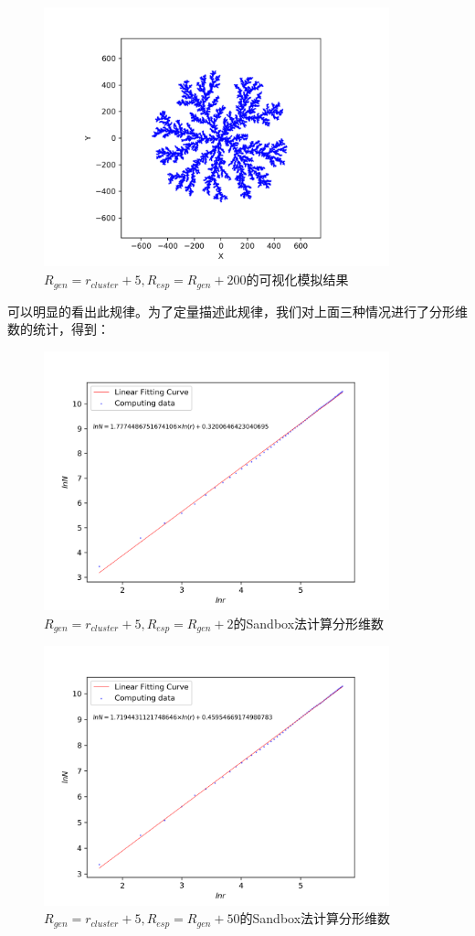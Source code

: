 \documentclass[a4paper,11pt]{article}
\begin{document}
\begin{figure}[!htbp]        
\centering
\includegraphics[bb= 0 0 460.8 345.6, width = 10cm]{改变max/5-205.png}      
\caption{$R_{gen} = r_{cluster} + 5, R_{esp} = R_{gen}+200$的可视化模拟结果}      
\end{figure}

\newpage 可以明显的看出此规律。为了定量描述此规律，我们对上面三种情况进行了分形维数的统计，得到：


\begin{figure}[!htbp]        
\centering
\includegraphics[bb= 0 0 460.8 345.6, width = 10cm]{分形维数/sandbox-5-7.png}      
\caption{$R_{gen} = r_{cluster} + 5, R_{esp} = R_{gen}+2$的Sandbox法计算分形维数}      
\end{figure}



\begin{figure}[!htbp]        
\centering
\includegraphics[bb= 0 0 460.8 345.6, width = 10cm]{分形维数/sandbox-5-55.png}      
\caption{$R_{gen} = r_{cluster} + 5, R_{esp} = R_{gen}+50$的Sandbox法计算分形维数}      
\end{figure}
\end{document}
